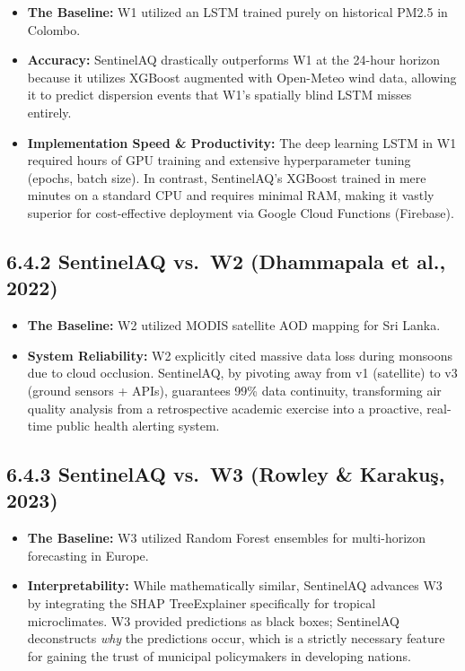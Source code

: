 \begin{itemize}
\tightlist
\item
  \textbf{The Baseline:} W1 utilized an LSTM trained purely on
  historical PM2.5 in Colombo.
\item
  \textbf{Accuracy:} SentinelAQ drastically outperforms W1 at the
  24-hour horizon because it utilizes XGBoost augmented with Open-Meteo
  wind data, allowing it to predict dispersion events that W1's
  spatially blind LSTM misses entirely.
\item
  \textbf{Implementation Speed \& Productivity:} The deep learning LSTM
  in W1 required hours of GPU training and extensive hyperparameter
  tuning (epochs, batch size). In contrast, SentinelAQ's XGBoost trained
  in mere minutes on a standard CPU and requires minimal RAM, making it
  vastly superior for cost-effective deployment via Google Cloud
  Functions (Firebase).
\end{itemize}

\subsection{6.4.2 SentinelAQ vs.~W2 (Dhammapala et al.,
2022)}\label{sentinelaq-vs.-w2-dhammapala-et-al.-2022}

\begin{itemize}
\tightlist
\item
  \textbf{The Baseline:} W2 utilized MODIS satellite AOD mapping for Sri
  Lanka.
\item
  \textbf{System Reliability:} W2 explicitly cited massive data loss
  during monsoons due to cloud occlusion. SentinelAQ, by pivoting away
  from v1 (satellite) to v3 (ground sensors + APIs), guarantees 99\%
  data continuity, transforming air quality analysis from a
  retrospective academic exercise into a proactive, real-time public
  health alerting system.
\end{itemize}

\subsection{6.4.3 SentinelAQ vs.~W3 (Rowley \& Karakuş,
2023)}\label{sentinelaq-vs.-w3-rowley-karakuux15f-2023}

\begin{itemize}
\tightlist
\item
  \textbf{The Baseline:} W3 utilized Random Forest ensembles for
  multi-horizon forecasting in Europe.
\item
  \textbf{Interpretability:} While mathematically similar, SentinelAQ
  advances W3 by integrating the SHAP TreeExplainer specifically for
  tropical microclimates. W3 provided predictions as black boxes;
  SentinelAQ deconstructs \emph{why} the predictions occur, which is a
  strictly necessary feature for gaining the trust of municipal
  policymakers in developing nations.
\end{itemize}

